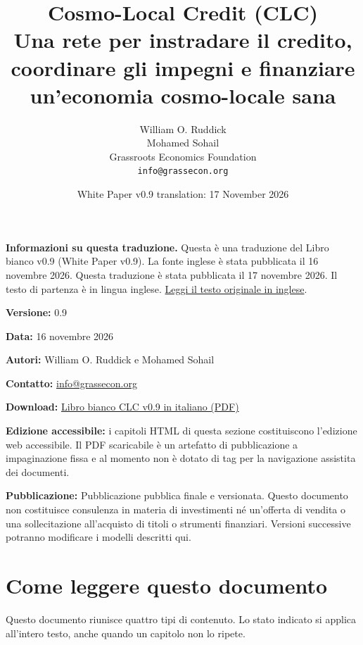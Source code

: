 \documentclass[11pt]{article}
\title{Cosmo-Local Credit (CLC)\\Una rete per instradare il credito, coordinare gli impegni e finanziare un'economia cosmo-locale sana}
\author{William O. Ruddick \\ Mohamed Sohail \\ Grassroots Economics Foundation \\ \texttt{info@grassecon.org}}
\date{White Paper v0.9 translation: 17 November 2026}
\begin{document}
\maketitle
\tableofcontents
\newpage
\sloppy
\RaggedRight

\textbf{Informazioni su questa traduzione.} Questa è una traduzione del Libro bianco v0.9 (White Paper v0.9). La fonte inglese è stata pubblicata il 16 novembre 2026. Questa traduzione è stata pubblicata il 17 novembre 2026. Il testo di partenza è in lingua inglese. \href{https://docs.cosmolocal.credit/white-paper}{Leggi il testo originale in inglese}.

\textbf{Versione:} 0.9

\textbf{Data:} 16 novembre 2026

\textbf{Autori:} William O. Ruddick e Mohamed Sohail

\textbf{Contatto:} \href{mailto:info@grassecon.org}{info@grassecon.org}

\textbf{Download:} \href{https://docs.cosmolocal.credit/white-paper/Cosmo-Local-Credit-CLC-White-Paper-v9-it.pdf}{Libro bianco CLC v0.9 in italiano (PDF)}

\textbf{Edizione accessibile:} i capitoli HTML di questa sezione costituiscono l'edizione web accessibile. Il PDF scaricabile è un artefatto di pubblicazione a impaginazione fissa e al momento non è dotato di tag per la navigazione assistita dei documenti.

\textbf{Pubblicazione:} Pubblicazione pubblica finale e versionata. Questo documento non costituisce consulenza in materia di investimenti né un'offerta di vendita o una sollecitazione all'acquisto di titoli o strumenti finanziari. Versioni successive potranno modificare i modelli descritti qui.

\section*{Come leggere questo documento}

Questo documento riunisce quattro tipi di contenuto. Lo stato indicato si applica all'intero testo, anche quando un capitolo non lo ripete.
\end{document}
